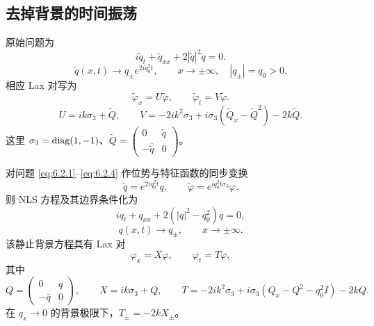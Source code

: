 \documentclass[lang=cn,scheme=chinese,mode=simple,device=normal,color=blue,
math=cm,thmcnt=section,12pt]{elegantbook}
\newcommand{\conj}[1]{\overline{#1}}
\newcommand{\eqq}[2]{\tag{#1}\label{eq:#1}#2}
\begin{document}
\subsection{去掉背景的时间振荡}
原始问题为
\begin{equation}\eqq{6.2.1}{i\widetilde q_t+\widetilde q_{xx}+2|\widetilde q|^2\widetilde q=0.}\end{equation}
\begin{equation}\eqq{6.2.2}{\widetilde q(x,t)\to q_\pm e^{2iq_0^2t},\qquad x\to\pm\infty,\quad |q_\pm|=q_0>0.}\end{equation}
相应 Lax 对写为
\begin{equation}\eqq{6.2.3}{\widetilde\varphi_x=U\widetilde\varphi,\qquad\widetilde\varphi_t=V\widetilde\varphi.}\end{equation}
\begin{equation}\eqq{6.2.4}{U=ik\sigma_3+\widetilde Q,\qquad V=-2ik^2\sigma_3+i\sigma_3(\widetilde Q_x-\widetilde Q^2)-2k\widetilde Q.}\end{equation}
这里 $\sigma_3=\operatorname{diag}(1,-1)$、$\widetilde Q=\begin{pmatrix}0&\widetilde q\\-\conj{\widetilde q}&0\end{pmatrix}$。
\setcounter{proposition}{0}
\begin{proposition}[静止非零边界的规范变换]\label{prop:6.1}
    对问题 \eqref{eq:6.2.1}--\eqref{eq:6.2.4} 作位势与特征函数的同步变换
    \begin{equation}\eqq{6.2.5}{\widetilde q=e^{2iq_0^2t}q,\qquad\widetilde\varphi=e^{iq_0^2t\sigma_3}\varphi.}\end{equation}
    则 NLS 方程及其边界条件化为
    \begin{equation}\eqq{6.2.6}{iq_t+q_{xx}+2(|q|^2-q_0^2)q=0,}\end{equation}
    \begin{equation}\eqq{6.2.7}{q(x,t)\to q_\pm,\qquad x\to\pm\infty.}\end{equation}
    该静止背景方程具有 Lax 对
    \begin{equation}\eqq{6.2.8}{\varphi_x=X\varphi,\qquad\varphi_t=T\varphi,}\end{equation}
    其中
    \[
        Q=\begin{pmatrix}0&q\\-\bar q&0\end{pmatrix},\qquad
        X=ik\sigma_3+Q,\qquad T=-2ik^2\sigma_3+i\sigma_3(Q_x-Q^2-q_0^2I)-2kQ.
    \]
    在 $q_x\to0$ 的背景极限下，$T_\pm=-2kX_\pm$。
\end{proposition}
\end{document}
